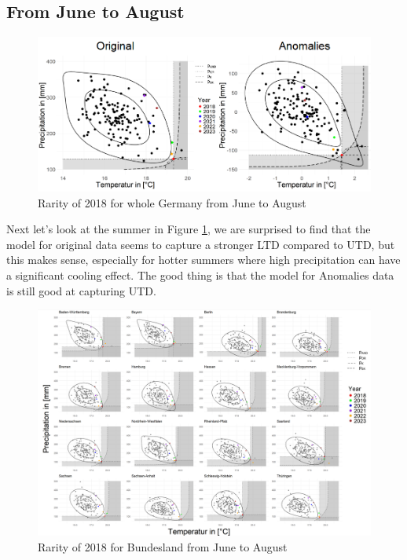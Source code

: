 \documentclass[
]{krantz}
\begin{document}
\subsection{From June to August}\label{JJA-shiyu}

\begin{figure}

{\centering \includegraphics[width=0.8\linewidth]{work/03-compounds/figures/RESULTS/resultallJJA} 

}

\caption{Rarity of 2018 for whole Germany from June to August}\label{fig:result4-shiyu}
\end{figure}

Next let's look at the summer in Figure \ref{fig:result4-shiyu}, we are surprised to find that the model for original data seems to capture a stronger LTD compared to UTD, but this makes sense, especially for hotter summers where high precipitation can have a significant cooling effect. The good thing is that the model for Anomalies data is still good at capturing UTD.

\begin{figure}

{\centering \includegraphics[width=0.8\linewidth]{work/03-compounds/figures/RESULTS/resultJJA} 

}

\caption{Rarity of 2018 for Bundesland from June to August}\label{fig:result5-shiyu}
\end{figure}
\end{document}
